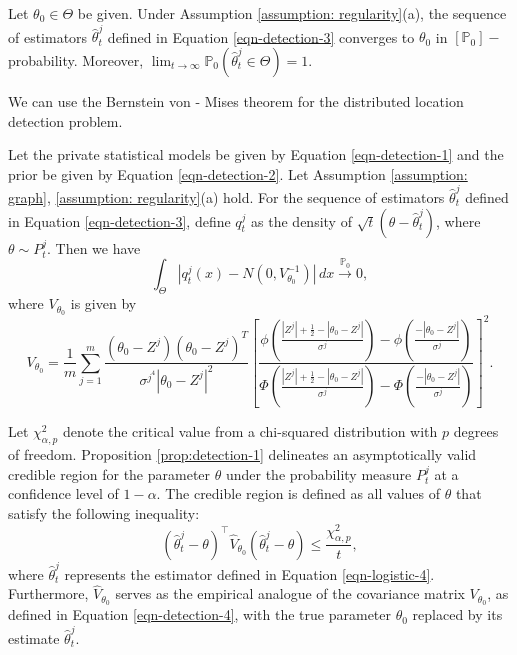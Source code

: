 \documentclass[twoside,11pt]{article}
\numberwithin{equation}{section}
\newcommand\bP{\mathbb{P}}
\newcommand{\pto}{\stackrel{\bP_0}{\to}}
\begin{document}
{\begin{lemma}\label{lemma:detection-1}
Let $\theta_0 \in \Theta$ be given.  Under Assumption \ref{assumption: regularity}(a), the sequence of estimators $\hat \theta_t^j$ defined in Equation \eqref{eqn-detection-3} converges to $\theta_0$ in $[\bP_0]-$probability. Moreover,  $\lim_{t \to \infty}\bP_0(\hat \theta_t^j \in \Theta) = 1$. 
\end{lemma}
We can use the Bernstein von - Mises theorem for the distributed location detection problem. 
\begin{proposition}\label{prop:detection-1}
Let the private statistical models be given by Equation \eqref{eqn-detection-1} and the prior be given by Equation \eqref{eqn-detection-2}. Let Assumption \ref{assumption: graph}, \ref{assumption: regularity}(a) hold.  For the sequence of estimators $\hat \theta_t^j$ defined in Equation \eqref{eqn-detection-3}, define $q_t^j$ as the density of $\sqrt{t}(\theta - \hat{\theta}_t^j)$, where $\theta \sim P_t^j$. Then we have
\begin{equation}
\int_\Theta \left|q_t^j(x) - N(0, V_{\theta_0}^{-1})\right| \, dx \pto 0, 
\end{equation}
where $V_{\theta_0}$ is given by
\begin{equation} \label{eqn-detection-4}
V_{\theta_0} = \frac{1}{m} \sum_{j = 1}^m \frac{(\theta_0 - Z^j) (\theta_0 - Z^j)^T}{\sigma^{j^4} |\theta_0 - Z^j|^2} \left[ \frac{\phi(\frac{|Z^j|+ \frac{1}{2} - |\theta_0 - Z^j|}{\sigma^j}) - \phi(\frac{- |\theta_0 - Z^j|}{\sigma^j})}{ \Phi(\frac{|Z^j|+ \frac{1}{2} - |\theta_0 - Z^j|}{\sigma^j}) - \Phi(\frac{- |\theta_0 - Z^j|}{\sigma^j}) } \right]^2. 
\end{equation}

\end{proposition}
Let $\chi_{\alpha, p}^2$ denote the critical value from a chi-squared distribution with $p$ degrees of freedom. Proposition \ref{prop:detection-1} delineates an asymptotically valid credible region for the parameter $\theta$ under the probability measure $P_t^j$ at a confidence level of $1 - \alpha$. The credible region is defined as all values of $\theta$ that satisfy the following inequality:
\begin{equation*}
    (\hat{\theta}_{t}^j - \theta)^\top \hat{V}_{\theta_0} (\hat{\theta}_{t}^j - \theta) \leq \frac{\chi_{\alpha, p}^2}{t},
\end{equation*}
where $\hat{\theta}_{t}^j$ represents the estimator defined in Equation \eqref{eqn-logistic-4}. Furthermore, $\hat{V}_{\theta_0}$ serves as the empirical analogue of the covariance matrix $V_{\theta_0}$, as defined in Equation \eqref{eqn-detection-4}, with the true parameter $\theta_0$ replaced by its estimate $\hat{\theta}_{t}^j$.

}
\end{document}
